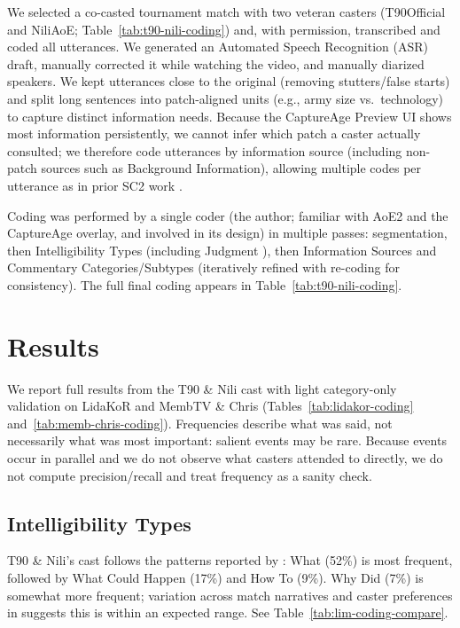 We selected a co-casted tournament match with two veteran casters (T90Official and NiliAoE; Table~\ref{tab:t90-nili-coding}) and, with permission, transcribed and coded all utterances. We generated an Automated Speech Recognition (ASR) draft, manually corrected it while watching the video, and manually diarized speakers. We kept utterances close to the original (removing stutters/false starts) and split long sentences into patch-aligned units (e.g., army size vs.\ technology) to capture distinct information needs. Because the CaptureAge Preview UI shows most information persistently, we cannot infer which patch a caster actually consulted; we therefore code utterances by information source (including non-patch sources such as Background Information), allowing multiple codes per utterance as in prior SC2 work \cite{dodge2018}.

Coding was performed by a single coder (the author; familiar with AoE2 and the CaptureAge overlay, and involved in its design) in multiple passes: segmentation, then Intelligibility Types (including Judgment \cite{dodge2018}), then Information Sources and Commentary Categories/Subtypes (iteratively refined with re-coding for consistency). The full final coding appears in Table~\ref{tab:t90-nili-coding}.

\section{Results}
\label{sec:prelim-analysis-results}
We report full results from the T90 \& Nili cast with light category-only validation on LidaKoR and MembTV \& Chris (Tables~\ref{tab:lidakor-coding} and~\ref{tab:memb-chris-coding}). Frequencies describe what was said, not necessarily what was most important: salient events may be rare. Because events occur in parallel \cite{lux2019} and we do not observe what casters attended to directly, we do not compute precision/recall and treat frequency as a sanity check.

\subsection{Intelligibility Types}
T90 \& Nili's cast follows the patterns reported by \citet{dodge2018}: What (52\%) is most frequent, followed by What Could Happen (17\%) and How To (9\%). Why Did (7\%) is somewhat more frequent; variation across match narratives and caster preferences in \citet{penney2021} suggests this is within an expected range. See Table~\ref{tab:lim-coding-compare}.

